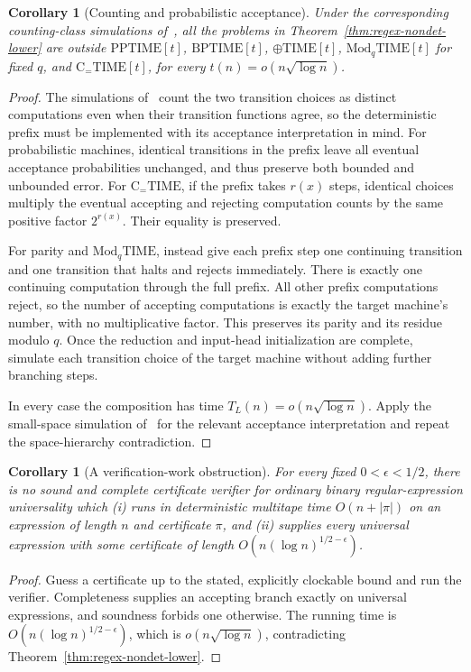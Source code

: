 \documentclass[11pt]{article}
\newtheorem{corollary}[theorem]{Corollary}
\theoremstyle{definition}
\theoremstyle{remark}
\begin{document}
\begin{corollary}[Counting and probabilistic acceptance]
\label{cor:regex-counting}
Under the corresponding counting-class simulations of~\cite{Cruz26},
all the problems in Theorem~\ref{thm:regex-nondet-lower} are outside
$\mathrm{PPTIME}[t]$, $\mathrm{BPTIME}[t]$, $\oplus\mathrm{TIME}[t]$,
$\mathrm{Mod}_q\mathrm{TIME}[t]$ for fixed $q$, and
$\mathrm C_=\mathrm{TIME}[t]$, for every
$t(n)=o(n\sqrt{\log n})$.
\end{corollary}
\begin{proof}
The simulations of~\cite{Cruz26} count the two transition choices as distinct
computations even when their transition functions agree, so the
deterministic prefix must be implemented with its acceptance
interpretation in mind.  For probabilistic machines, identical
transitions in the prefix leave all eventual acceptance probabilities
unchanged, and thus preserve both bounded and unbounded error.
For $\mathrm C_=\mathrm{TIME}$, if the prefix takes $r(x)$ steps,
identical choices multiply the eventual accepting and rejecting
computation counts by the same positive factor $2^{r(x)}$.
Their equality is preserved.

For parity and $\mathrm{Mod}_q\mathrm{TIME}$, instead give each
prefix step one continuing transition and one transition that halts
and rejects immediately.  There is exactly one continuing computation
through the full prefix.  All other prefix computations reject, so
the number of accepting computations is exactly the target machine's
number, with no multiplicative factor.  This preserves its parity
and its residue modulo $q$.
Once the reduction and input-head initialization are complete,
simulate each transition choice of the target machine without adding
further branching steps.

In every case the composition has time
$T_L(n)=o(n\sqrt{\log n})$. Apply the small-space simulation
of~\cite{Cruz26} for the relevant acceptance interpretation and repeat
the space-hierarchy contradiction.
\end{proof}

\begin{corollary}[A verification-work obstruction]
\label{cor:regex-verifier}
For every fixed $0<\epsilon<1/2$, there is no sound and complete
certificate verifier for ordinary binary regular-expression universality
which (i) runs in deterministic multitape time $O(n+|\pi|)$ on an
expression of length $n$ and certificate $\pi$, and (ii) supplies every
universal expression with some certificate of length
$O(n(\log n)^{1/2-\epsilon})$.
\end{corollary}
\begin{proof}
Guess a certificate up to the stated, explicitly clockable bound and
run the verifier. Completeness supplies an accepting branch exactly
on universal expressions, and soundness forbids one otherwise. The
running time is $O(n(\log n)^{1/2-\epsilon})$, which is
$o(n\sqrt{\log n})$, contradicting
Theorem~\ref{thm:regex-nondet-lower}.
\end{proof}
\end{document}
